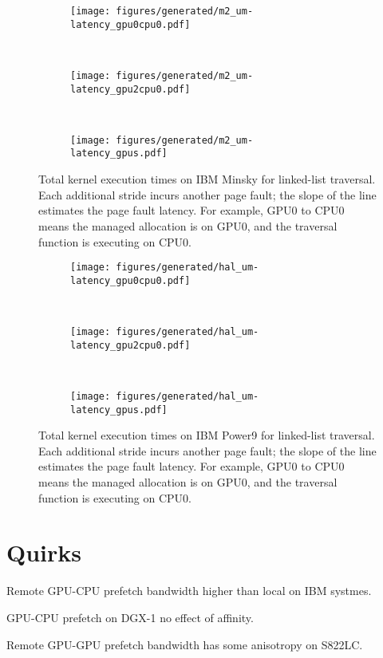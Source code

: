 \begin{figure}[ht]
	\centering
	\begin{subfigure}[b]{0.3\textwidth}
		\texttt{[image: figures/generated/m2\_um-latency\_gpu0cpu0.pdf]}
		\caption{}
		\label{}
	\end{subfigure}
	~
	\begin{subfigure}[b]{0.3\textwidth}
		\texttt{[image: figures/generated/m2\_um-latency\_gpu2cpu0.pdf]}
		\caption{}
		\label{}
	\end{subfigure}
	~
	\begin{subfigure}[b]{0.3\textwidth}
		\texttt{[image: figures/generated/m2\_um-latency\_gpus.pdf]}
		\caption{}
		\label{}
	\end{subfigure}
	\caption[]{ 
		Total kernel execution times on IBM Minsky for linked-list traversal.
		Each additional stride incurs another page fault; the slope of the line estimates the page fault latency.
		For example, GPU0 to CPU0 means the managed allocation is on GPU0, and the traversal function is executing on CPU0.
	}
	\label{fig:minsky-page-fault-latency}
\end{figure}


\begin{figure}[ht]
	\centering
	\begin{subfigure}[b]{0.3\textwidth}
		\texttt{[image: figures/generated/hal\_um-latency\_gpu0cpu0.pdf]}
		\caption{}
		\label{}
	\end{subfigure}
	~
	\begin{subfigure}[b]{0.3\textwidth}
		\texttt{[image: figures/generated/hal\_um-latency\_gpu2cpu0.pdf]}
		\caption{}
		\label{}
	\end{subfigure}
	~
	\begin{subfigure}[b]{0.3\textwidth}
		\texttt{[image: figures/generated/hal\_um-latency\_gpus.pdf]}
		\caption{}
		\label{}
	\end{subfigure}
	\caption[]{
		Total kernel execution times on IBM Power9 for linked-list traversal.
		Each additional stride incurs another page fault; the slope of the line estimates the page fault latency.
		For example, GPU0 to CPU0 means the managed allocation is on GPU0, and the traversal function is executing on CPU0.
	}
	\label{fig:hal-page-fault-latency}
\end{figure}

\section{Quirks}

Remote GPU-CPU prefetch bandwidth higher than local on IBM systmes.

GPU-CPU prefetch on DGX-1 no effect of affinity.

Remote GPU-GPU prefetch bandwidth has some anisotropy on S822LC.